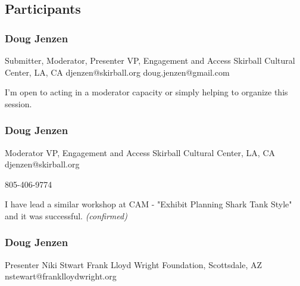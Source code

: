 \documentclass{report}
\begin{document}
            \subsection*{Participants}
              \subsubsection*{ Doug  Jenzen }
              Submitter, Moderator, Presenter\newline
              VP, Engagement and Access\newline
              Skirball Cultural Center, LA, CA
              \newline
              djenzen@skirball.org\newline
              doug.jenzen@gmail.com\newline
              

              I'm open to acting in a moderator capacity or simply helping to organize this session.\newline


              
                \subsubsection*{ Doug Jenzen }
                Moderator\newline
                VP, Engagement and Access\newline
                Skirball Cultural Center, LA, CA
                \newline
                djenzen@skirball.org\newline
                
                805-406-9774\newline

                I have lead a similar workshop at CAM - "Exhibit Planning Shark Tank Style" and it was successful.\newline
                \emph{ (confirmed) }
              

              
                \subsubsection*{ Doug Jenzen }
                Presenter\newline
                Niki Stwart\newline
                Frank Lloyd Wright Foundation, Scottsdale, AZ
                \newline
                nstewart@franklloydwright.org\newline
                
\end{document}

